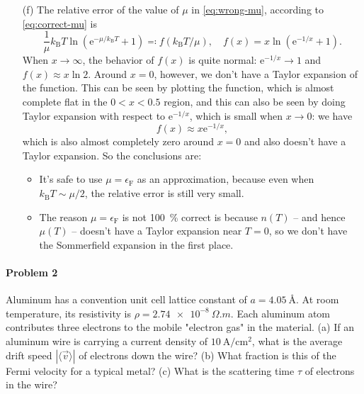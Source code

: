 \documentclass[hyperref, a4paper]{article}
\newcommand*{\ee}{\mathrm{e}}
\begin{document}
\begin{itemize}
\item[(f)] The relative error of the value of $\mu$ in \eqref{eq:wrong-mu},
according to \eqref{eq:correct-mu} is 
\begin{equation}
    \frac{1}{\mu} k_{\text{B}} T \ln (\ee^{- \mu / k_{\text{B}} T} + 1) \eqqcolon
    f(k_{\text{B}} T / \mu), \quad f(x) = x \ln (\ee^{- 1/x} + 1).
\end{equation}
When $x \to \infty$, the behavior of $f(x)$ is quite normal: $\ee^{-1/x} \to 1$ and $f(x) \approx x \ln 2$.
Around $x = 0$, however, we don't have a Taylor expansion of the function.
This can be seen by plotting the function,
which is almost complete flat in the $0 < x < 0.5$ region,
and this can also be seen by doing Taylor expansion with respect to $\ee^{- 1 / x}$, 
which is small when $x \to 0$: we have 
\[
    f(x) \approx x \ee^{- 1 / x},
\]
which is also almost completely zero around $x = 0$ and also doesn't have a Taylor expansion. 
So the conclusions are:
\begin{itemize}
    \item It's safe to use $\mu = \epsilon_{\text{F}}$ as an approximation,
    because even when $k_{\text{B}} T \sim \mu / 2$, 
    the relative error is still very small.
    \item The reason $\mu = \epsilon_{\text{F}}$ is not \SI{100}{\percent} correct 
    is because $n(T)$ -- and hence $\mu(T)$ -- doesn't have a Taylor expansion near $T = 0$,
    so we don't have the Sommerfield expansion in the first place.
\end{itemize} 

\end{itemize}


\paragraph{Problem 2} Aluminum has a convention unit cell lattice constant of $a=\SI{4.05}{\angstrom}$. 
At room temperature, its resistivity is $\rho=\SI{2.74e-8}{\Omega.m}$. Each aluminum atom contributes three electrons to the mobile "electron gas" in the material.
(a) If an aluminum wire is carrying a current density of $10 \mathrm{~A} / \mathrm{cm}^2$, what is the average drift speed $|\langle\vec{v}\rangle|$ of electrons down the wire?
(b) What fraction is this of the Fermi velocity for a typical metal?
(c) What is the scattering time $\tau$ of electrons in the wire?
\end{document}
